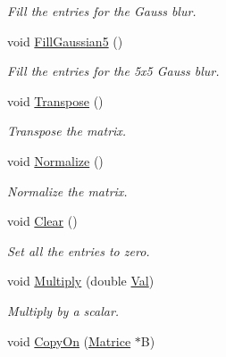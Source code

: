 \begin{DoxyCompactItemize}
\begin{DoxyCompactList}\small\item\em Fill the entries for the Gauss blur. \end{DoxyCompactList}\item 
void \hyperlink{classMatrice_a0173aba64404b8145dda86796cb34231}{Fill\+Gaussian5} ()\hypertarget{classMatrice_a0173aba64404b8145dda86796cb34231}{}\label{classMatrice_a0173aba64404b8145dda86796cb34231}

\begin{DoxyCompactList}\small\item\em Fill the entries for the 5x5 Gauss blur. \end{DoxyCompactList}\item 
void \hyperlink{classMatrice_a109318636af36bc89e9853f19e4369e2}{Transpose} ()\hypertarget{classMatrice_a109318636af36bc89e9853f19e4369e2}{}\label{classMatrice_a109318636af36bc89e9853f19e4369e2}

\begin{DoxyCompactList}\small\item\em Transpose the matrix. \end{DoxyCompactList}\item 
void \hyperlink{classMatrice_af279e0f0ff720ee54d6733674dfda50a}{Normalize} ()\hypertarget{classMatrice_af279e0f0ff720ee54d6733674dfda50a}{}\label{classMatrice_af279e0f0ff720ee54d6733674dfda50a}

\begin{DoxyCompactList}\small\item\em Normalize the matrix. \end{DoxyCompactList}\item 
void \hyperlink{classMatrice_aa71d36872f416feaa853788a7a7a7ef8}{Clear} ()\hypertarget{classMatrice_aa71d36872f416feaa853788a7a7a7ef8}{}\label{classMatrice_aa71d36872f416feaa853788a7a7a7ef8}

\begin{DoxyCompactList}\small\item\em Set all the entries to zero. \end{DoxyCompactList}\item 
void \hyperlink{classMatrice_a5361e904e6972f204c5a22456e4b2160}{Multiply} (double \hyperlink{classMatrice_a2a233d9af97c320a1b372ededf056886}{Val})\hypertarget{classMatrice_a5361e904e6972f204c5a22456e4b2160}{}\label{classMatrice_a5361e904e6972f204c5a22456e4b2160}

\begin{DoxyCompactList}\small\item\em Multiply by a scalar. \end{DoxyCompactList}\item 
void \hyperlink{classMatrice_a2639c6c871beec77d99b2a28c4b77610}{Copy\+On} (\hyperlink{classMatrice}{Matrice} $\ast$B)\hypertarget{classMatrice_a2639c6c871beec77d99b2a28c4b77610}{}\label{classMatrice_a2639c6c871beec77d99b2a28c4b77610}


\end{DoxyCompactItemize}
